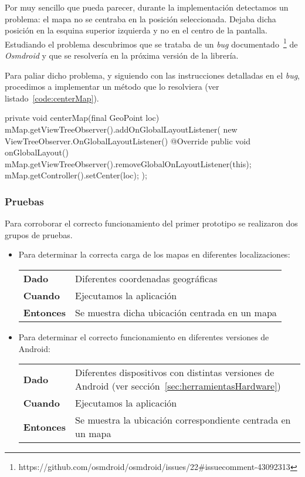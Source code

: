 Por muy sencillo que pueda parecer, durante la implementación detectamos un problema: el mapa no se
centraba en la posición seleccionada. Dejaba dicha posición en la esquina superior izquierda y no en
el centro de la pantalla. Estudiando el problema descubrimos que se trataba de un \emph{bug}
documentado~\footnote{https://github.com/osmdroid/osmdroid/issues/22\#issuecomment-43092313} de
\emph{Osmdroid} y que se resolvería en la próxima versión de la librería.

Para paliar dicho problema, y siguiendo con las instrucciones detalladas en el \emph{bug},
procedimos a implementar un método que lo resolviera (ver listado~\ref{code:centerMap}).

\begin{listing}[
  float=ht,
  language = java,
  caption  = {Método utilizado para centrar el mapa en cualquier posición},
  label    = code:centerMap]
private void centerMap(final GeoPoint loc) {
    mMap.getViewTreeObserver().addOnGlobalLayoutListener(
            new ViewTreeObserver.OnGlobalLayoutListener() {
        @Override
        public void onGlobalLayout() {
            mMap.getViewTreeObserver().removeGlobalOnLayoutListener(this);
            mMap.getController().setCenter(loc);
        }
    });
}
\end{listing}

\subsubsection{Pruebas}

Para corroborar el correcto funcionamiento del primer prototipo se realizaron dos grupos de pruebas.

\newpage
\begin{itemize}
  \item Para determinar la correcta carga de los mapas en diferentes localizaciones:

  \begin{tabular}{p{}p{}}
    \hline
    \textbf{Dado}     & Diferentes coordenadas geográficas \\
    \textbf{Cuando}   & Ejecutamos la aplicación \\
    \textbf{Entonces} & Se muestra dicha ubicación centrada en un mapa \\
    \hline
  \end{tabular}

  \item Para determinar el correcto funcionamiento en diferentes versiones de Android:

  \begin{tabular}{p{}p{}}
    \hline 
    \textbf{Dado} & Diferentes dispositivos con distintas versiones de Android (ver
    sección~\ref{sec:herramientasHardware}) \\
    \textbf{Cuando} & Ejecutamos la aplicación \\ 
    \textbf{Entonces} & Se muestra la ubicación correspondiente centrada en un mapa \\ 
    \hline
  \end{tabular}
\end{itemize}

